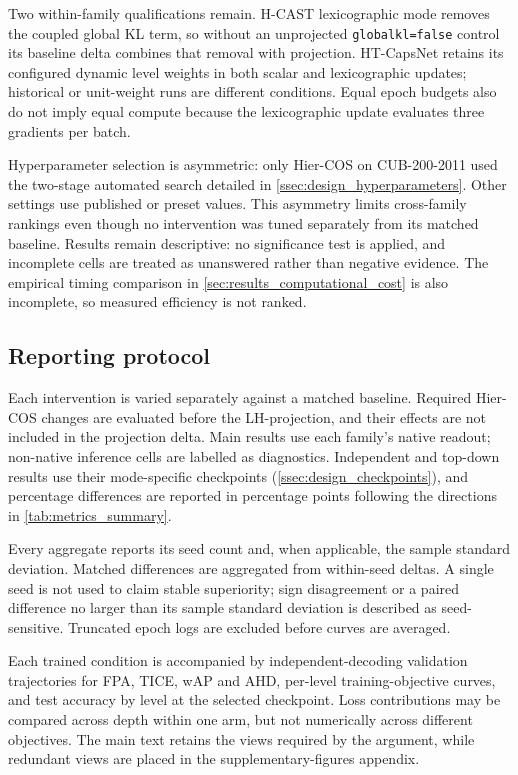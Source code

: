 Two within-family qualifications remain. H-CAST lexicographic mode removes the
coupled global KL term, so without an unprojected
\texttt{globalkl=false} control its baseline delta combines that removal with
projection. HT-CapsNet retains its configured dynamic level weights in both
scalar and lexicographic updates; historical or unit-weight runs are different
conditions. Equal epoch budgets also do not imply equal compute because the
lexicographic update evaluates three gradients per batch.

Hyperparameter selection is asymmetric: only Hier-COS on CUB-200-2011 used the
two-stage automated search detailed in \cref{ssec:design_hyperparameters}.
Other settings use published or preset values. This asymmetry limits
cross-family rankings even though no intervention was tuned separately from its
matched baseline. Results remain descriptive: no significance test is applied,
and incomplete cells are treated as unanswered rather than negative evidence.
The empirical timing comparison in \cref{sec:results_computational_cost} is also
incomplete, so measured efficiency is not ranked.

\subsection{Reporting protocol}
\label{ssec:design_protocol}

Each intervention is varied separately against a matched baseline. Required
Hier-COS changes are evaluated before the LH-projection, and their effects are
not included in the projection delta. Main results use each family's native
readout; non-native inference cells are labelled as diagnostics. Independent
and top-down results use their mode-specific checkpoints
(\cref{ssec:design_checkpoints}), and percentage differences are reported in
percentage points following the directions in \cref{tab:metrics_summary}.

Every aggregate reports its seed count and, when applicable, the sample
standard deviation. Matched differences are aggregated from within-seed deltas.
A single seed is not used to claim stable superiority; sign disagreement or a
paired difference no larger than its sample standard deviation is described as
seed-sensitive. Truncated epoch logs are excluded before curves are averaged.

Each trained condition is accompanied by independent-decoding validation
trajectories for FPA, TICE, wAP and AHD, per-level training-objective curves, and
test accuracy by level at the selected checkpoint. Loss contributions may be
compared across depth within one arm, but not numerically across different
objectives. The main text retains the views required by the argument, while
redundant views are placed in the supplementary-figures appendix.

